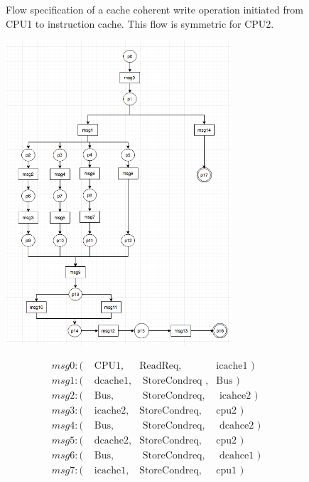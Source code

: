 \documentclass[12pt,frontmatter,copyright,thesis]{usfmanus}
\begin{document}
\begin{appendix}
\begin{figure}[h]
\begin{minipage}{.5\textwidth}
{\[\begin{array}{llll}
 \\
 \end{array}
 \]}
\end{minipage}
 \caption{\footnotesize Flow specification of a cache coherent write operation initiated from CPU1 to instruction cache. \footnotesize This flow is symmetric for CPU2. }
 \label{write-flow}
 \end{figure}
 \begin{figure}
 \centering
  \includegraphics[width=3.3in]{figures/Fih6.png}
  \begin{minipage}{.5\textwidth}
 {\footnotesize
 \[
 \begin{array}{llll}
 msg0: (&\mbox{ CPU1},&\mbox{ReadReq},&\mbox{icache1  })\\                   
 msg1: (&\mbox{ dcache1},&\mbox{ StoreCondreq },&\mbox{Bus })\\           
 msg2: (&\mbox{ Bus},&\mbox{ StoreCondreq},&\mbox{ icahce2 })\\
 msg3: (&\mbox{ icache2},&\mbox{StoreCondreq},&\mbox{cpu2       })\\      
 msg4: (&\mbox{ Bus},&\mbox{ StoreCondreq},&\mbox{ dcahce2           })\\ 
 msg5: (&\mbox{ dcache2},&\mbox{StoreCondreq},&\mbox{cpu2 })\\
 msg6: (&\mbox{ Bus},&\mbox{ StoreCondreq},&\mbox{ dcahce1     })\\       
 msg7: (&\mbox{ icache1},&\mbox{StoreCondreq},&\mbox{cpu1           })
  \end{array}
\]}
\end{minipage}
\end{figure}
\end{appendix}
\end{document}
